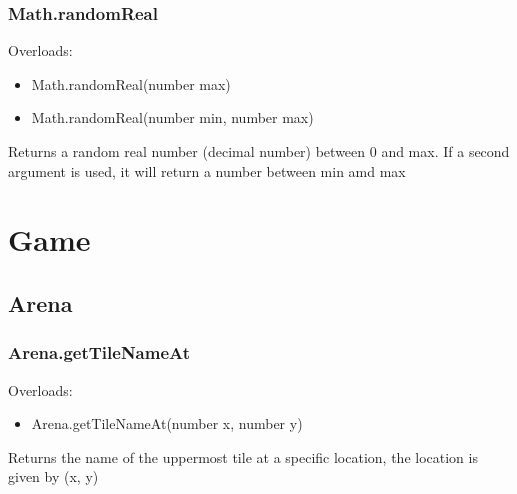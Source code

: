 \documentclass{book}
\newenvironment{ulist}
	{\begin{itemize}
			\itemsep0em}
	{\end{itemize}}
\begin{document}
\subsubsection{Math.randomReal}
Overloads:
\begin{ulist}
	\item Math.randomReal(number max)
	\item Math.randomReal(number min, number max)
\end{ulist}
Returns a random real number (decimal number) between 0 and max.
If a second argument is used, it will return a number between min amd max



\section{Game}
\subsection{Arena}
\subsubsection{Arena.getTileNameAt}
Overloads:
\begin{ulist}
	\item Arena.getTileNameAt(number x, number y)
\end{ulist}
Returns the name of the uppermost tile at a specific location, the location is given by (x, y)

\subsection{}
\end{document}
